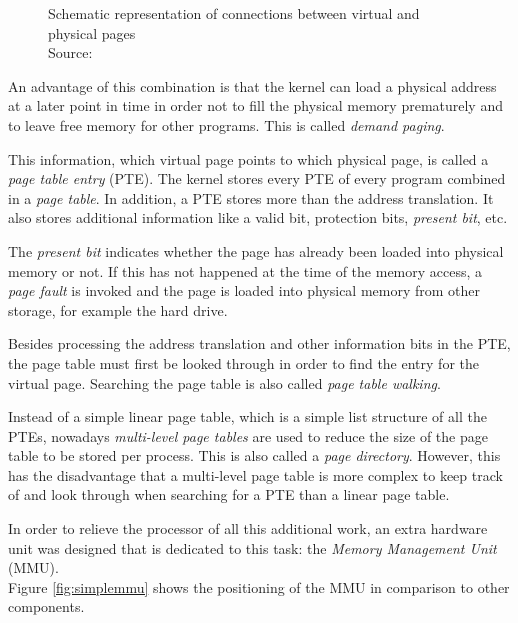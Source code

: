 \begin{figure}[H]
\begin{minipage}[b]{0.6\textwidth}
         \caption{Schematic representation of connections between virtual and physical pages\\
         Source: \cite{pic:singlephysical}}
         \label{fig:pagephysical}
     \end{minipage}
\end{figure}    
\vspace{-\baselineskip}

An advantage of this combination is that the kernel can load a physical address at a later point in time in order not to fill the physical memory prematurely and to leave free memory for other programs. This is called \textit{demand paging}. \cite[p. 240]{threeeasy} \cite[p. 299]{computerarch}

This information, which virtual page points to which physical page, is called a \textit{page table entry} (PTE). The kernel stores every PTE of every program combined in a \textit{page table}. In addition, a PTE stores more than the address translation. It also stores additional information like a valid bit, protection bits, \textit{present bit}, etc. \cite[p. 172-174]{threeeasy} \cite[p. 199-200]{tanenbaum}

The \textit{present bit} indicates whether the page has already been loaded into physical memory or not. If this has not happened at the time of the memory access, a \textit{page fault} is invoked and the page is loaded into physical memory from other storage, for example the hard drive.  \cite[p. 174]{threeeasy} \cite[p. 200]{tanenbaum}
\enlargethispage{\baselineskip}

Besides processing the address translation and other information bits in the PTE, the page table must first be looked through in order to find the entry for the virtual page. Searching the page table is also called \textit{page table walking}. \cite[p. 187]{threeeasy} \cite[p. 204-205]{tanenbaum}

\newpage

Instead of a simple linear page table, which is a simple list structure of all the PTEs, nowadays \textit{multi-level page tables} are used to reduce the size of the page table to be stored per process. This is also called a \textit{page directory}. However, this has the disadvantage that a multi-level page table is more complex to keep track of and look through when searching for a PTE than a linear page table. \cite[p. 205-207]{threeeasy} \cite[p. 205-207]{tanenbaum}

In order to relieve the processor of all this additional work, an extra hardware unit was designed that is dedicated to this task: the \textit{Memory Management Unit} (MMU). \cite[p. 135]{threeeasy} \cite[p. 195-196]{tanenbaum}\\
Figure \ref{fig:simplemmu} shows the positioning of the MMU in comparison to other components.

